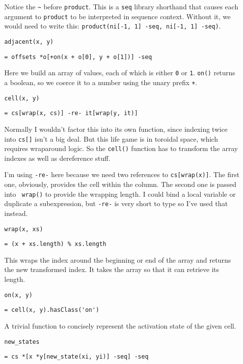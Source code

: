 \documentclass{report}
\begin{document}
\begin{enumerate}
  Notice the {\tt \textasciitilde} before {\tt product}. This is a {\tt seq} library shorthand that causes each argument to {\tt product} to be interpreted in sequence context. Without
  it, we would need to write this: {\tt product(ni[-1, 1] -seq, ni[-1, 1] -seq)}.

\item[{\tt adjacent(x, y)}]
\begin{verbatim}
= offsets *o[+on(x + o[0], y + o[1])] -seq
\end{verbatim}

  Here we build an array of values, each of which is either {\tt 0} or {\tt 1}. {\tt on()} returns a boolean, so we coerce it to a number using the unary prefix {\tt +}.

\item[{\tt cell(x, y)}]
\begin{verbatim}
= cs[wrap(x, cs)] -re- it[wrap(y, it)]
\end{verbatim}

  Normally I wouldn't factor this into its own function, since indexing twice into {\tt cs[]} isn't a big deal. But this life game is in toroidal space, which requires wraparound
  logic. So the {\tt cell()} function has to transform the array indexes as well as dereference stuff.

  I'm using {\tt -re-} here because we need two references to {\tt cs[wrap(x)]}. The first one, obviously, provides the cell within the column. The second one is passed into {\tt
  wrap()} to provide the wrapping length. I could bind a local variable or duplicate a subexpression, but {\tt -re-} is very short to type so I've used that instead.

\item[{\tt wrap(x, xs)}]
\begin{verbatim}
= (x + xs.length) % xs.length
\end{verbatim}

  This wraps the index around the beginning or end of the array and returns the new transformed index. It takes the array so that it can retrieve its length.

\item[{\tt on(x, y)}]
\begin{verbatim}
= cell(x, y).hasClass('on')
\end{verbatim}

  A trivial function to concisely represent the activation state of the given cell.

\item[{\tt new\_states}]
\begin{verbatim}
= cs *[x *y[new_state(xi, yi)] -seq] -seq
\end{verbatim}


\end{enumerate}
\end{document}
